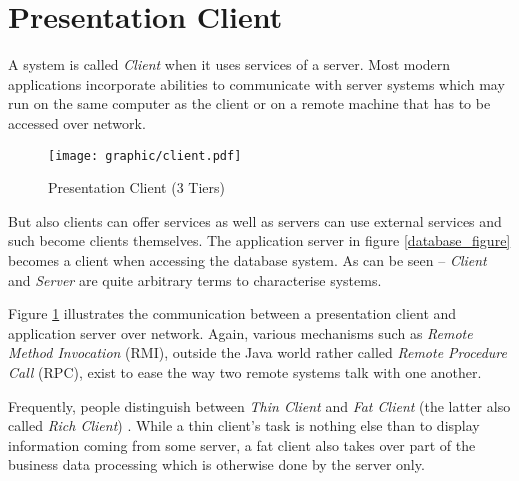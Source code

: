 %
%
%
%
%
%
%

\section{Presentation Client}
\label{presentation_client_heading}

A system is called \emph{Client} when it uses services of a server. Most modern
applications incorporate abilities to communicate with server systems which may
run on the same computer as the client or on a remote machine that has to be
accessed over network.

\begin{figure}[ht]
    \begin{center}
        \texttt{[image: graphic/client.pdf]}
        \caption{Presentation Client (3 Tiers)}
        \label{client_figure}
    \end{center}
\end{figure}

But also clients can offer services as well as servers can use external services
and such become clients themselves. The application server in figure
\ref{database_figure} becomes a client when accessing the database system.
As can be seen -- \emph{Client} and \emph{Server} are quite arbitrary terms to
characterise systems.

Figure \ref{client_figure} illustrates the communication between a presentation
client and application server over network. Again, various mechanisms such as
\emph{Remote Method Invocation} (RMI), outside the Java world rather called
\emph{Remote Procedure Call} (RPC), exist to ease the way two remote systems
talk with one another.

Frequently, people distinguish between \emph{Thin Client} and \emph{Fat Client}
(the latter also called \emph{Rich Client}) \cite[p. 176]{zimmermann}. While a
thin client's task is nothing else than to display information coming from some
server, a fat client also takes over part of the business data processing which
is otherwise done by the server only.
